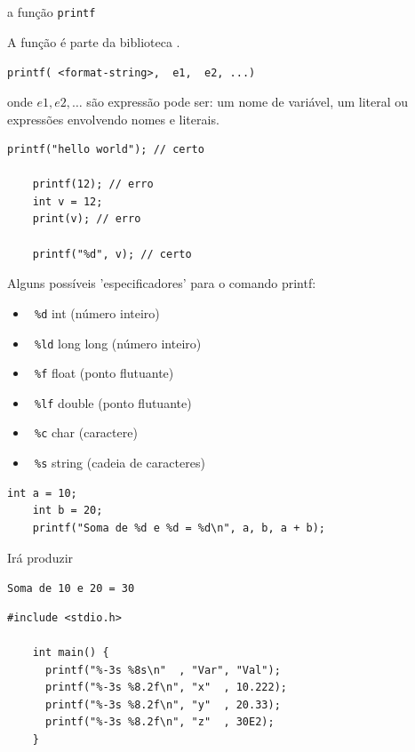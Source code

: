 \documentclass{beamer}
\begin{document}
\begin{frame}{a função \texttt{printf}}

  A função  é parte da biblioteca .

  \texttt{printf({\color{red} <format-string>}, {\color{green} e1}, {\color{green} e2}, ...)}

  onde $e1, e2,\ldots$ são expressão pode ser: um nome de variável, um
  literal ou expressões envolvendo nomes e literais.\vspace{.6cm}

  \begin{lstlisting}[style=normalc]
    printf("hello world"); // certo

    printf(12); // erro
    int v = 12; 
    print(v); // erro

    printf("%d", v); // certo
  \end{lstlisting}

  \framebreak

  Alguns possíveis 'especificadores' para o comando printf:
  
  \begin{itemize}
  \item \texttt{\color{red} \%d} int (número inteiro)
  \item \texttt{\color{red} \%ld} long long (número inteiro)
  \item \texttt{\color{red} \%f} float (ponto flutuante)
  \item \texttt{\color{red} \%lf} double (ponto flutuante)
  \item \texttt{\color{red} \%c} char (caractere)
  \item \texttt{\color{red} \%s} string (cadeia de caracteres)  
  \end{itemize}

  \framebreak

  \begin{lstlisting}[style=normalc]
    int a = 10;
    int b = 20;
    printf("Soma de %d e %d = %d\n", a, b, a + b);
  \end{lstlisting}

  Irá produzir

  \texttt{Soma de 10 e 20 = 30}

  \framebreak

  \begin{lstlisting}[style=normalc]
    #include <stdio.h>

    int main() {
      printf("%-3s %8s\n"  , "Var", "Val");
      printf("%-3s %8.2f\n", "x"  , 10.222);
      printf("%-3s %8.2f\n", "y"  , 20.33);
      printf("%-3s %8.2f\n", "z"  , 30E2);
    }
  \end{lstlisting}


\end{frame}
\end{document}
